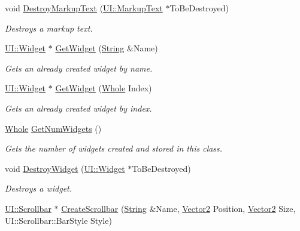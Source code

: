 \begin{DoxyCompactItemize}
void \hyperlink{classphys_1_1UILayer_a75d488037b5bcc97e88249de10ba1d64}{DestroyMarkupText} (\hyperlink{classphys_1_1UI_1_1MarkupText}{UI::MarkupText} $\ast$ToBeDestroyed)
\begin{DoxyCompactList}\small\item\em Destroys a markup text. \item\end{DoxyCompactList}\item 
\hyperlink{classphys_1_1UI_1_1Widget}{UI::Widget} $\ast$ \hyperlink{classphys_1_1UILayer_ab5389a6ec5d5d534f7da852819fbc71b}{GetWidget} (\hyperlink{namespacephys_aa03900411993de7fbfec4789bc1d392e}{String} \&Name)
\begin{DoxyCompactList}\small\item\em Gets an already created widget by name. \item\end{DoxyCompactList}\item 
\hyperlink{classphys_1_1UI_1_1Widget}{UI::Widget} $\ast$ \hyperlink{classphys_1_1UILayer_ab16bb514422f10dab03dca0a6f269a66}{GetWidget} (\hyperlink{namespacephys_a460f6bc24c8dd347b05e0366ae34f34a}{Whole} Index)
\begin{DoxyCompactList}\small\item\em Gets an already created widget by index. \item\end{DoxyCompactList}\item 
\hyperlink{namespacephys_a460f6bc24c8dd347b05e0366ae34f34a}{Whole} \hyperlink{classphys_1_1UILayer_aa745147022b7f78cdc5bccca57985459}{GetNumWidgets} ()
\begin{DoxyCompactList}\small\item\em Gets the number of widgets created and stored in this class. \item\end{DoxyCompactList}\item 
void \hyperlink{classphys_1_1UILayer_a5c8d3069ecbc38669251532dc5860e5e}{DestroyWidget} (\hyperlink{classphys_1_1UI_1_1Widget}{UI::Widget} $\ast$ToBeDestroyed)
\begin{DoxyCompactList}\small\item\em Destroys a widget. \item\end{DoxyCompactList}\item 
\hyperlink{classphys_1_1UI_1_1Scrollbar}{UI::Scrollbar} $\ast$ \hyperlink{classphys_1_1UILayer_aa76c7da9eff4981dc48133d5f29ef6e7}{CreateScrollbar} (\hyperlink{namespacephys_aa03900411993de7fbfec4789bc1d392e}{String} \&Name, \hyperlink{classphys_1_1Vector2}{Vector2} Position, \hyperlink{classphys_1_1Vector2}{Vector2} Size, UI::Scrollbar::BarStyle Style)

\end{DoxyCompactItemize}
